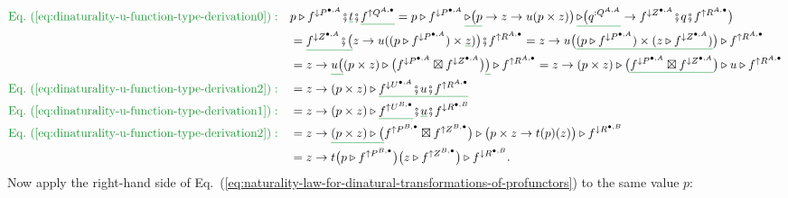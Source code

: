 \begin{align*}
{\color{greenunder}\text{Eq.~(\ref{eq:dinaturality-u-function-type-derivation0})}:}\quad & p\triangleright f^{\downarrow P^{\bullet,A}}\bef\gunderline t\bef\gunderline{f^{\uparrow Q^{A,\bullet}}}=p\triangleright f^{\downarrow P^{\bullet,A}}\,\gunderline{\triangleright\big(p}\rightarrow z\rightarrow u(p\times z)\big)\,\gunderline{\triangleright\big(q^{:Q^{A,A}}}\rightarrow f^{\downarrow Z^{\bullet,A}}\bef q\bef f^{\uparrow R^{A,\bullet}}\big)\\
 & =\gunderline{f^{\downarrow Z^{\bullet,A}}\bef\big(}z\rightarrow u((p\triangleright f^{\downarrow P^{\bullet,A}})\times\gunderline z)\big)\bef f^{\uparrow R^{A,\bullet}}=z\rightarrow u\big(\gunderline{(p\triangleright f^{\downarrow P^{\bullet,A}})\times(z\triangleright f^{\downarrow Z^{\bullet,A}})}\big)\triangleright f^{\uparrow R^{A,\bullet}}\\
 & =z\rightarrow\gunderline{u\big(}(p\times z)\triangleright\big(f^{\downarrow P^{\bullet,A}}\boxtimes f^{\downarrow Z^{\bullet,A}}\big)\gunderline{\big)}\triangleright f^{\uparrow R^{A,\bullet}}=z\rightarrow(p\times z)\triangleright\big(\gunderline{f^{\downarrow P^{\bullet,A}}\boxtimes f^{\downarrow Z^{\bullet,A}}}\big)\triangleright u\triangleright f^{\uparrow R^{A,\bullet}}\\
{\color{greenunder}\text{Eq.~(\ref{eq:dinaturality-u-function-type-derivation2})}:}\quad & =z\rightarrow(p\times z)\triangleright\gunderline{f^{\downarrow U^{\bullet,A}}\bef u\bef f^{\uparrow R^{A,\bullet}}}\\
{\color{greenunder}\text{Eq.~(\ref{eq:dinaturality-u-function-type-derivation1})}:}\quad & =z\rightarrow(p\times z)\triangleright\gunderline{f^{\uparrow U^{B,\bullet}}}\bef\gunderline u\bef f^{\downarrow R^{\bullet,B}}\\
{\color{greenunder}\text{Eq.~(\ref{eq:dinaturality-u-function-type-derivation2})}:}\quad & =z\rightarrow\gunderline{(p\times z)\triangleright\big(}f^{\uparrow P^{B,\bullet}}\boxtimes f^{\uparrow Z^{B,\bullet}}\big)\triangleright\big(p\times z\rightarrow t(p)(z)\big)\triangleright f^{\downarrow R^{\bullet,B}}\\
 & =z\rightarrow t\big(p\triangleright f^{\uparrow P^{B,\bullet}}\big)\big(z\triangleright f^{\uparrow Z^{B,\bullet}}\big)\triangleright f^{\downarrow R^{\bullet,B}}.
\end{align*}
Now apply the right-hand side of Eq.~(\ref{eq:naturality-law-for-dinatural-transformations-of-profunctors})
to the same value $p$:
